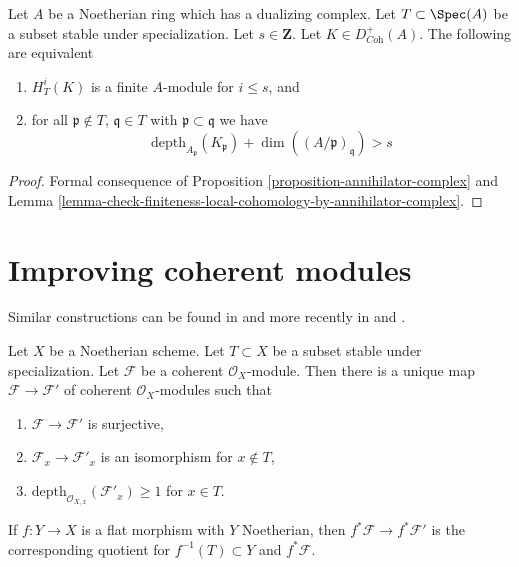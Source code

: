 \begin{proposition}
\label{proposition-finiteness-complex}
Let $A$ be a Noetherian ring which has a dualizing complex.
Let $T \subset \Spec(A)$ be a subset stable under specialization.
Let $s \in \mathbf{Z}$. Let $K \in D_{\textit{Coh}}^+(A)$.
The following are equivalent
\begin{enumerate}
\item $H^i_T(K)$ is a finite $A$-module for $i \leq s$, and
\item for all $\mathfrak p \not \in T$, $\mathfrak q \in T$ with
$\mathfrak p \subset \mathfrak q$ we have
$$
\text{depth}_{A_\mathfrak p}(K_\mathfrak p) +
\dim((A/\mathfrak p)_\mathfrak q) > s
$$
\end{enumerate}
\end{proposition}

\begin{proof}
Formal consequence of
Proposition \ref{proposition-annihilator-complex} and
Lemma \ref{lemma-check-finiteness-local-cohomology-by-annihilator-complex}.
\end{proof}






\section{Improving coherent modules}
\label{section-improve}

\noindent
Similar constructions can be found in \cite{EGA} and more recently in
\cite{Kollar-local-global-hulls} and \cite{Kollar-variants}.

\begin{lemma}
\label{lemma-get-depth-1-along-Z}
Let $X$ be a Noetherian scheme. Let $T \subset X$ be a subset
stable under specialization. Let $\mathcal{F}$ be a coherent
$\mathcal{O}_X$-module. Then there is a unique map
$\mathcal{F} \to \mathcal{F}'$ of coherent $\mathcal{O}_X$-modules
such that
\begin{enumerate}
\item $\mathcal{F} \to \mathcal{F}'$ is surjective,
\item $\mathcal{F}_x \to \mathcal{F}'_x$ is an isomorphism for $x \not \in T$,
\item $\text{depth}_{\mathcal{O}_{X, x}}(\mathcal{F}'_x) \geq 1$ for $x \in T$.
\end{enumerate}
If $f : Y \to X$ is a flat morphism with $Y$ Noetherian, then
$f^*\mathcal{F} \to f^*\mathcal{F}'$ is the corresponding
quotient for $f^{-1}(T) \subset Y$ and $f^*\mathcal{F}$.
\end{lemma}

